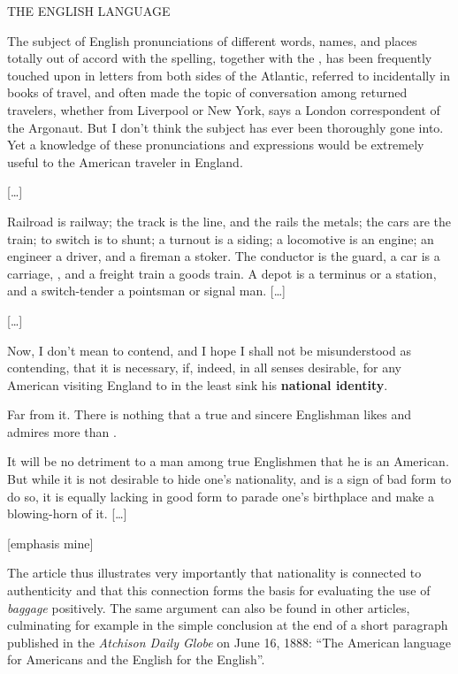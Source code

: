 \newpage

\begin{ipquote}
\begin{center}
THE ENGLISH LANGUAGE    
\end{center}
{The subject of English pronunciations of different words, names, and places totally out of accord with the spelling, together with the , has been frequently touched upon in letters from both sides of the Atlantic, referred to incidentally in books of travel, and often made the topic of conversation among returned travelers, whether from Liverpool or New York, says a London correspondent of the Argonaut. But I don’t think the subject has ever been thoroughly gone into. Yet a knowledge of these pronunciations and expressions would be extremely useful to the American traveler in England.

\centering
{[…]}

} {Railroad is railway; the track is the line, and the rails the metals; the cars are the train; to switch is to shunt; a turnout is a siding; a locomotive is an engine; an engineer a driver, and a fireman a stoker. The conductor is the guard, a car is a carriage, , and a freight train a goods train. A depot is a terminus or a station, and a switch-tender a pointsman or signal man. […]

\centering
{[…]}

Now, I don’t mean to contend, and I hope I shall not be misunderstood as contending, that it is necessary, if, indeed, in all senses desirable, for any American visiting England to in the least sink his \textbf{national identity}.} Far from it. There is nothing that a true and sincere Englishman likes and admires more than . {It will be no detriment to a man among true Englishmen that he is an American. But while it is not desirable to hide one’s nationality, and is a sign of bad form to do so, it is equally lacking in good form to parade one’s birthplace and make a blowing-horn of it. […]

\raggedleft
{[emphasis mine]}\\
}
\end{ipquote}


The article thus illustrates very importantly that nationality is connected to authenticity and that this connection forms the basis for evaluating the use of \emph{baggage} positively. The same argument can also be found in other articles, culminating for example in the simple conclusion at the end of a short paragraph published in the \emph{Atchison Daily Globe} on June 16, 1888: “The American language for Americans and the English for the English”.


